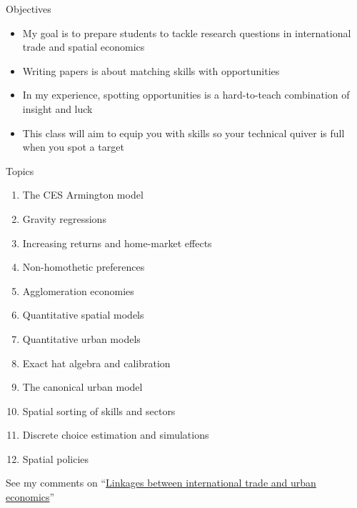 \documentclass[10pt,notes=hide]{beamer}
\begin{document}
\begin{frame}{Objectives}
\begin{itemize}
\item My goal is to prepare students to tackle research questions in international trade and spatial economics
\item Writing papers is about matching skills with opportunities
\item In my experience, spotting opportunities is a hard-to-teach combination of insight and luck
\item This class will aim to equip you with skills so your technical quiver is full when you spot a target
\end{itemize}
\end{frame}
\begin{frame}{Topics}
\begin{enumerate}
\item The CES Armington model
\item Gravity regressions
\item Increasing returns and home-market effects
\item Non-homothetic preferences
\item Agglomeration economies
\item Quantitative spatial models
\item Quantitative urban models
\item Exact hat algebra and calibration
\item The canonical urban model
\item Spatial sorting of skills and sectors
\item Discrete choice estimation and simulations
\item Spatial policies
\end{enumerate}
See my comments on ``\href{https://tradediversion.net/2017/09/17/linkages-between-international-trade-and-urban-economics/}{Linkages between international trade and urban economics}''
\end{frame}
\end{document}
